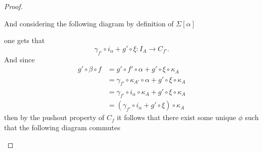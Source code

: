 \begin{proof}
\begin{enumerate}[label={(\bfseries TR\arabic*)}]
{            And considering the following diagram by definition of \( \Sigma [\alpha] \)
            \begin{center}
            \end{center}
            one gets that
            \[
                \gamma_{f'} \circ i_{\alpha} + g' \circ \xi: I_A \to C_{f'}.
            \]
            And since
            \begin{align*}
                g' \circ \beta \circ f &= g' \circ f' \circ \alpha + g' \circ \xi \circ \kappa_A \\
                &= \gamma_{f'} \circ \kappa_{A'} \circ \alpha + g' \circ \xi \circ \kappa_A \\
                &= \gamma_{f'} \circ i_{\alpha} \circ \kappa_A + g' \circ \xi \circ \kappa_A \\
                &= (\gamma_{f'} \circ i_{\alpha} + g' \circ \xi) \circ \kappa_A
            \end{align*}
            then by the pushout property of \( C_f \) it follows that there exist some unique \( \phi \) such that the following diagram commutes
            \begin{center}
\end{center}}
\end{enumerate}
\end{proof}
